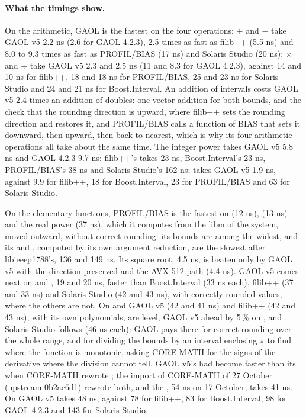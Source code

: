 \paragraph{What the timings show.}
On the arithmetic, GAOL is the fastest on the four operations: $+$ and $-$
take GAOL v5 2.2 ns (2.6 for GAOL 4.2.3), 2.5 times as fast as filib++
(5.5 ns) and 8.0 to 9.3 times as fast as PROFIL/BIAS (17 ns) and Solaris
Studio (20 ns); $\times$ and $\div$ take GAOL v5 2.3 and 2.5 ns (11 and
8.3 for GAOL 4.2.3), against 14 and 10 ns for filib++, 18 and 18 ns
for PROFIL/BIAS, 25 and 23 ns for Solaris Studio and 24 and 21 ns for
Boost.Interval. An addition of intervals costs GAOL v5 2.4 times an
addition of doubles: one vector addition for both bounds, and the check that the rounding
direction is upward, where filib++ sets the rounding direction and restores
it, and PROFIL/BIAS calls a function of BIAS that sets it downward, then
upward, then back to nearest, which is why its four arithmetic operations
all take about the same time. The integer power  takes
GAOL v5 5.8 ns and GAOL 4.2.3 9.7 ns: filib++'s  takes
23 ns, Boost.Interval's 23 ns, PROFIL/BIAS's 38 ns and Solaris Studio's
 162 ns;  takes GAOL v5 1.9 ns, against 9.9 for
filib++, 18 for Boost.Interval, 23 for PROFIL/BIAS and 63 for Solaris
Studio.

\medskip
On the elementary functions, PROFIL/BIAS is the fastest on  (12 ns),  (13 ns) and the real power
 (37 ns), which it computes from the libm of the system,
moved outward, without correct rounding: its bounds are among the widest,
and its  and , computed by its own argument reduction,
are the slowest after libieeep1788's, 136 and 149 ns. Its square root, 4.5 ns,
is beaten only by GAOL v5 with the direction preserved and the AVX-512 path
(4.4 ns). GAOL v5 comes next on
 and , 19 and 20 ns, faster than Boost.Interval (33 ns
each), filib++ (37 and 33 ns) and Solaris Studio (42 and 43 ns), with
correctly rounded values, where the others are not. On  and
 GAOL v5 (42 and 41 ns) and filib++ (42 and 43 ns), with its own
polynomials, are level, GAOL v5 ahead by 5\,\% on , and Solaris
Studio follows (46 ns each): GAOL pays there for correct rounding over the
whole range, and for dividing the bounds by an interval enclosing $\pi$ to
find where the function is monotonic, asking CORE-MATH for the signs of the
derivative where the division cannot tell. GAOL v5's  had become
faster than its  when CORE-MATH rewrote ; the import of
CORE-MATH of 27 October (upstream 0b2ae6d1) rewrote both, and the
, 54 ns on 17 October, takes 41 ns. On  GAOL v5
takes 48 ns, against 78 for filib++, 83 for Boost.Interval, 98 for GAOL
4.2.3 and 143 for Solaris Studio.

